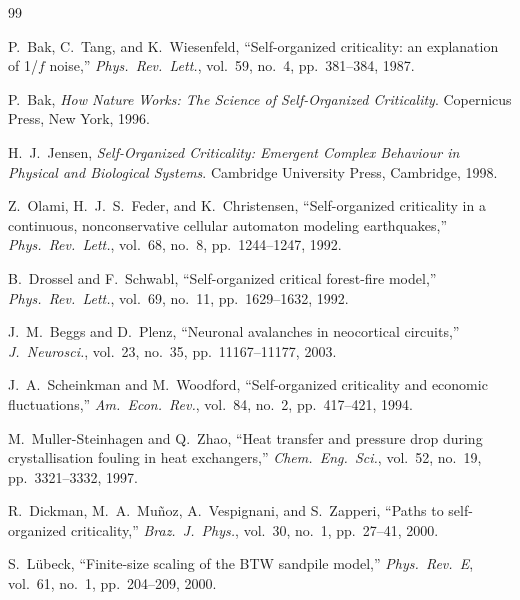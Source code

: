 \documentclass[10pt,a4paper,twocolumn]{article}
\begin{document}
\begin{thebibliography}{99}

  P.~Bak, C.~Tang, and K.~Wiesenfeld,
  ``Self-organized criticality: an explanation of 1/$f$ noise,''
  \emph{Phys.\ Rev.\ Lett.}, vol.~59, no.~4, pp.~381--384, 1987.

  P.~Bak,
  \emph{How Nature Works: The Science of Self-Organized Criticality}.
  Copernicus Press, New York, 1996.

  H.~J.~Jensen,
  \emph{Self-Organized Criticality: Emergent Complex Behaviour in Physical
  and Biological Systems}.
  Cambridge University Press, Cambridge, 1998.

  Z.~Olami, H.~J.~S.~Feder, and K.~Christensen,
  ``Self-organized criticality in a continuous, nonconservative cellular
  automaton modeling earthquakes,''
  \emph{Phys.\ Rev.\ Lett.}, vol.~68, no.~8, pp.~1244--1247, 1992.

  B.~Drossel and F.~Schwabl,
  ``Self-organized critical forest-fire model,''
  \emph{Phys.\ Rev.\ Lett.}, vol.~69, no.~11, pp.~1629--1632, 1992.

  J.~M.~Beggs and D.~Plenz,
  ``Neuronal avalanches in neocortical circuits,''
  \emph{J.\ Neurosci.}, vol.~23, no.~35, pp.~11167--11177, 2003.

  J.~A.~Scheinkman and M.~Woodford,
  ``Self-organized criticality and economic fluctuations,''
  \emph{Am.\ Econ.\ Rev.}, vol.~84, no.~2, pp.~417--421, 1994.

  M.~Muller-Steinhagen and Q.~Zhao,
  ``Heat transfer and pressure drop during crystallisation fouling in
  heat exchangers,''
  \emph{Chem.\ Eng.\ Sci.}, vol.~52, no.~19, pp.~3321--3332, 1997.

  R.~Dickman, M.~A.~Mu{\~n}oz, A.~Vespignani, and S.~Zapperi,
  ``Paths to self-organized criticality,''
  \emph{Braz.\ J.\ Phys.}, vol.~30, no.~1, pp.~27--41, 2000.

  S.~L{\"u}beck,
  ``Finite-size scaling of the BTW sandpile model,''
  \emph{Phys.\ Rev.\ E}, vol.~61, no.~1, pp.~204--209, 2000.

\end{thebibliography}
\end{document}
